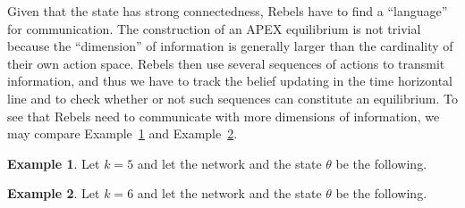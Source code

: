 \documentclass[12pt,letter]{article}
\theoremstyle{definition}
\newtheorem{example}{Example}[section]
\theoremstyle{remark}
\theoremstyle{claim}
\begin{document}
Given that the state has strong connectedness, Rebels have to find a ``language'' for communication. The construction of an APEX equilibrium is not trivial because the ``dimension'' of information is generally larger than the cardinality of their own action space. Rebels then use several sequences of actions to transmit information, and thus we have to track the belief updating in the time horizontal line and to check whether or not such sequences can constitute an equilibrium. To see that Rebels need to communicate with more dimensions of information, we may compare Example~\ref{ex_cycle_number_5} and Example~\ref{ex_cycle_number_6}.


\begin{example}\label{ex_cycle_number_5}
Let $k=5$ and let the network and the state $\theta$ be the following.

\begin{center} 
\end{center} 

\end{example}


\begin{example}\label{ex_cycle_number_6}
Let $k=6$ and let the network and the state $\theta$ be the following.
\begin{center} 
\end{center} 


\end{example}
\end{document}
